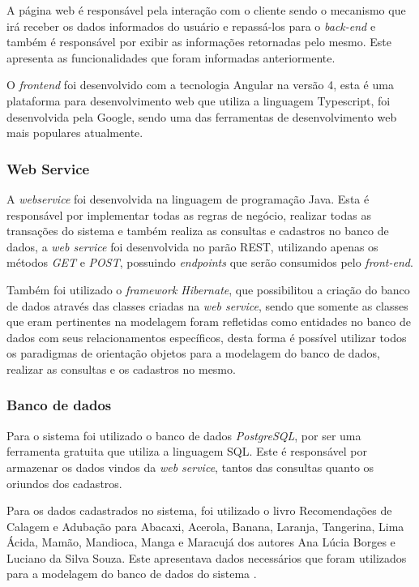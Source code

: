 \documentclass[
12pt,				%
oneside,			%
a4paper,			%
english,			%
french,				%
spanish,			%
brazil				%
]{abntex2}
\begin{document}
 A página web é responsável pela interação com o cliente sendo o mecanismo que irá
 receber os dados informados do usuário e repassá-los para o \textit{back-end} e também é responsável por exibir as informações retornadas pelo mesmo. Este apresenta as funcionalidades que foram informadas anteriormente.
 
 O \textit{frontend} foi desenvolvido com a tecnologia Angular na versão 4, esta é uma plataforma para desenvolvimento web que utiliza a linguagem Typescript, foi desenvolvida pela Google, sendo uma das ferramentas de desenvolvimento web mais populares atualmente.
 
\subsubsection{Web Service}

A \textit{webservice} foi desenvolvida na linguagem de programação Java. Esta é responsável por implementar todas as regras de negócio, realizar todas as transações do sistema e também realiza as consultas e cadastros no banco de dados, a \textit{web service} foi desenvolvida no parão REST, utilizando apenas os métodos \textit{GET} e \textit{POST}, possuindo \textit{endpoints} que serão consumidos pelo \textit{front-end}.

Também foi utilizado o \textit{framework Hibernate}, que possibilitou a criação do banco de dados através das classes criadas na \textit{web service}, sendo que somente as classes que eram pertinentes na modelagem foram refletidas como entidades no banco de dados com seus relacionamentos específicos, desta forma é possível utilizar todos os paradigmas de orientação objetos para a modelagem do banco de dados, realizar as consultas e os cadastros no mesmo.

\subsubsection{Banco de dados}

Para o sistema foi utilizado o banco de dados \textit{PostgreSQL}, por ser uma ferramenta gratuita que utiliza a linguagem SQL. Este é responsável por armazenar os dados vindos da \textit{web service}, tantos das consultas quanto os oriundos dos cadastros.

Para os dados cadastrados no sistema, foi utilizado o livro Recomendações de Calagem e Adubação para Abacaxi, Acerola, Banana, Laranja, Tangerina, Lima Ácida, Mamão, Mandioca, Manga e Maracujá dos autores Ana Lúcia Borges e Luciano da Silva Souza. Este apresentava dados necessários que foram utilizados para a modelagem do banco de dados do sistema \cite{borges2009recomendaccoes}.
\end{document}
